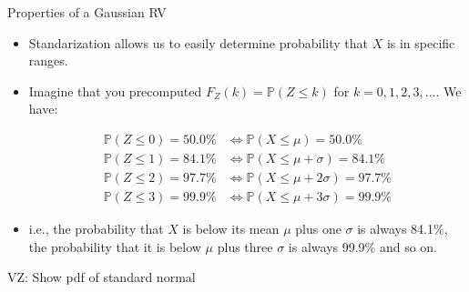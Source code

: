\documentclass[9pt]{beamer}
\begin{document}
%
\begin{frame}{Properties of a Gaussian RV}

\begin{itemize}
\item Standarization allows us to easily determine probability that $X$ is in specific ranges.

\item Imagine that you precomputed $F_Z(k)=\mathbb{P}(Z\leq k)$ for $k=0,1,2,3,...$. We have:
\begin{block}{}
\begin{align*}
\mathbb{P}(Z\leq 0)=50.0\%&\Longleftrightarrow\mathbb{P}(X\leq \mu)=50.0\%\\
\mathbb{P}(Z\leq 1)=84.1\%&\Longleftrightarrow\mathbb{P}(X\leq \mu+\sigma)=84.1\%\\
\mathbb{P}(Z\leq 2)=97.7\%&\Longleftrightarrow\mathbb{P}(X\leq \mu+2\sigma)=97.7\%\\
\mathbb{P}(Z\leq 3)=99.9\%&\Longleftrightarrow\mathbb{P}(X\leq \mu+3\sigma)=99.9\%
\end{align*}
\end{block}
\item i.e., the probability that $X$ is below its mean $\mu$ plus one $\sigma$ is always 84.1\%, the probability that it is below $\mu$ plus three $\sigma$ is always 99.9\% and so on.  
\end{itemize} 
\begin{block}{}
{\color{red} VZ: Show pdf of standard normal}
\end{block}

\end{frame}
\end{document}
